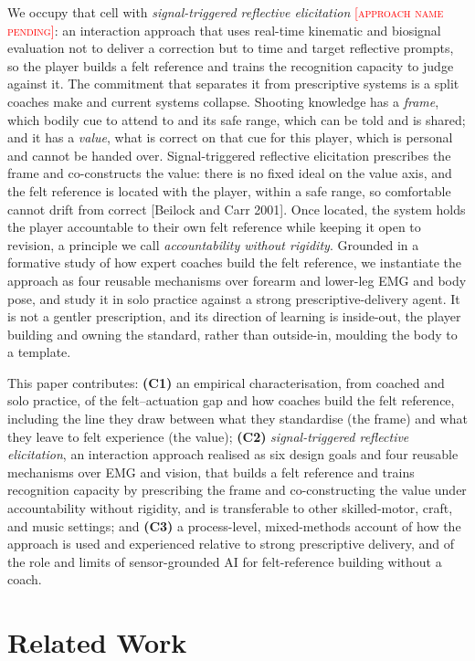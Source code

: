 \documentclass[sigconf]{acmart}
\newcommand{\approach}{signal-triggered reflective elicitation} %
\newcommand{\Approach}{Signal-triggered reflective elicitation}
\newcommand{\vf}[1]{\textcolor{red}{[\textsc{#1}]}}
\begin{document}
We occupy that cell with \emph{\approach} \vf{approach name pending}: an interaction approach that uses real-time kinematic and biosignal evaluation not to deliver a correction but to time and target reflective prompts, so the player builds a felt reference and trains the recognition capacity to judge against it. The commitment that separates it from prescriptive systems is a split coaches make and current systems collapse. Shooting knowledge has a \emph{frame}, which bodily cue to attend to and its safe range, which can be told and is shared; and it has a \emph{value}, what is correct on that cue for this player, which is personal and cannot be handed over. \Approach{} prescribes the frame and co-constructs the value: there is no fixed ideal on the value axis, and the felt reference is located with the player, within a safe range, so comfortable cannot drift from correct [Beilock and Carr 2001]. Once located, the system holds the player accountable to their own felt reference while keeping it open to revision, a principle we call \emph{accountability without rigidity}. Grounded in a formative study of how expert coaches build the felt reference, we instantiate the approach as four reusable mechanisms over forearm and lower-leg EMG and body pose, and study it in solo practice against a strong prescriptive-delivery agent. It is not a gentler prescription, and its direction of learning is inside-out, the player building and owning the standard, rather than outside-in, moulding the body to a template.

This paper contributes: \textbf{(C1)} an empirical characterisation, from coached and solo practice, of the felt--actuation gap and how coaches build the felt reference, including the line they draw between what they standardise (the frame) and what they leave to felt experience (the value); \textbf{(C2)} \emph{\approach}, an interaction approach realised as six design goals and four reusable mechanisms over EMG and vision, that builds a felt reference and trains recognition capacity by prescribing the frame and co-constructing the value under accountability without rigidity, and is transferable to other skilled-motor, craft, and music settings; and \textbf{(C3)} a process-level, mixed-methods account of how the approach is used and experienced relative to strong prescriptive delivery, and of the role and limits of sensor-grounded AI for felt-reference building without a coach.

\section{Related Work}
\end{document}
